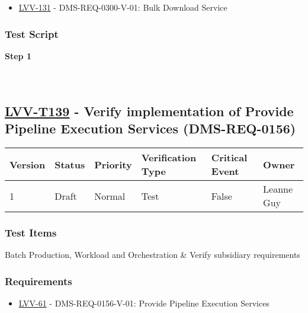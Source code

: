 \begin{itemize}
\tightlist
\item
  \href{https://jira.lsstcorp.org/browse/LVV-131}{LVV-131} -
  DMS-REQ-0300-V-01: Bulk Download Service
\end{itemize}

\hypertarget{test-script-38}{%
\subsubsection{Test Script}\label{test-script-38}}

\textbf{Step 1}\\
~\\
~\\

\hypertarget{lvv-t139---verify-implementation-of-provide-pipeline-execution-services-dms-req-0156}{%
\subsection{\texorpdfstring{\href{https://jira.lsstcorp.org/secure/Tests.jspa\#/testCase/LVV-T139}{LVV-T139}
- Verify implementation of Provide Pipeline Execution Services
(DMS-REQ-0156)}{LVV-T139 - Verify implementation of Provide Pipeline Execution Services (DMS-REQ-0156)}}\label{lvv-t139---verify-implementation-of-provide-pipeline-execution-services-dms-req-0156}}

\begin{longtable}[]{@{}llllll@{}}
\toprule
Version & Status & Priority & Verification Type & Critical Event &
Owner\tabularnewline
\midrule
\endhead
1 & Draft & Normal & Test & False & Leanne Guy\tabularnewline
\bottomrule
\end{longtable}

\hypertarget{test-items-39}{%
\subsubsection{Test Items}\label{test-items-39}}

Batch Production, Workload and Orchestration \& Verify subsidiary
requirements

\hypertarget{requirements-39}{%
\subsubsection{Requirements}\label{requirements-39}}

\begin{itemize}
\tightlist
\item
  \href{https://jira.lsstcorp.org/browse/LVV-61}{LVV-61} -
  DMS-REQ-0156-V-01: Provide Pipeline Execution Services
\end{itemize}

